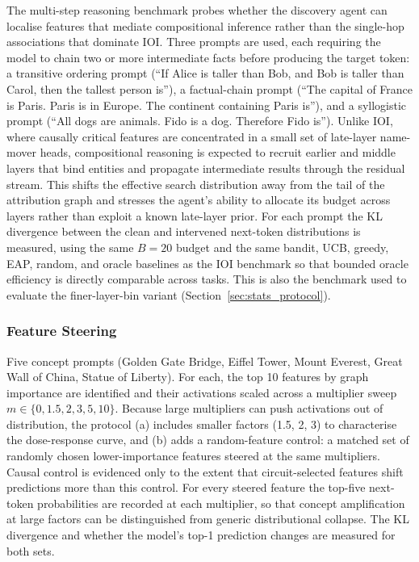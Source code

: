 The multi-step reasoning benchmark probes whether the discovery agent
can localise features that mediate compositional inference rather than
the single-hop associations that dominate IOI.  Three prompts are
used, each requiring the model to chain two or more intermediate facts
before producing the target token: a transitive ordering prompt
(``If Alice is taller than Bob, and Bob is taller than Carol, then
the tallest person is''), a factual-chain prompt
(``The capital of France is Paris.  Paris is in Europe.  The continent
containing Paris is''), and a syllogistic prompt
(``All dogs are animals.  Fido is a dog.  Therefore Fido is'').
Unlike IOI, where causally critical features are concentrated in a
small set of late-layer name-mover heads, compositional reasoning is
expected to recruit earlier and middle layers that bind entities and
propagate intermediate results through the residual stream.  This
shifts the effective search distribution away from the tail of the
attribution graph and stresses the agent's ability to allocate its
budget across layers rather than exploit a known late-layer prior.
For each prompt the KL divergence between the clean and intervened
next-token distributions is measured, using the same $B=20$ budget
and the same bandit, UCB, greedy, EAP, random, and oracle baselines as the
IOI benchmark so that bounded oracle efficiency is directly comparable
across tasks. This is also the benchmark used to evaluate the
finer-layer-bin variant (Section~\ref{sec:stats_protocol}).

\subsubsection{Feature Steering}

Five concept prompts (Golden Gate Bridge, Eiffel Tower, Mount Everest,
Great Wall of China, Statue of Liberty).
For each, the top 10 features by graph importance are identified and
their activations scaled across a multiplier sweep
$m \in \{0, 1.5, 2, 3, 5, 10\}$. Because large multipliers can push
activations out of distribution, the protocol (a) includes smaller factors
(1.5, 2, 3) to characterise the dose-response curve, and (b) adds a
random-feature control: a matched set of randomly chosen
lower-importance features steered at the same multipliers. Causal
control is evidenced only to the extent that circuit-selected features shift
predictions more than this control. For every steered feature the top-five
next-token probabilities are recorded at each multiplier, so that
concept amplification at large factors can be distinguished from generic
distributional collapse. The KL divergence and whether the
model's top-1 prediction changes are measured for both sets.

